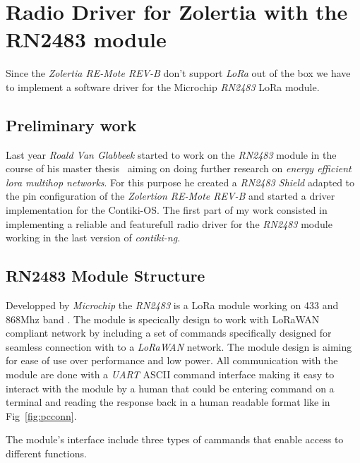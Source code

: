 \chapter{Radio Driver for Zolertia with the RN2483 module}


Since the \emph{Zolertia RE-Mote REV-B} don't support \emph{LoRa} out of the
box we have to implement a software driver for the Microchip \emph{RN2483} LoRa
module.

\section{Preliminary work}

Last year \emph{Roald Van Glabbeek} started to work on the \emph{RN2483} module
in the course of his master thesis~\cite{8847137} aiming on doing further
research on \emph{energy efficient lora multihop networks}. For this purpose he
created a \emph{RN2483 Shield} adapted to the pin configuration of the
\emph{Zolertion RE-Mote REV-B} and started a driver implementation for the
Contiki-OS\@. The first part of my work consisted in implementing a reliable
and featurefull radio driver for the \emph{RN2483} module working in the last
version of \emph{contiki-ng}.

\section{RN2483 Module Structure}

Developped by \emph{Microchip} the \emph{RN2483} is a LoRa module working on
433 and 868Mhz band . The module is specically design to work with LoRaWAN
compliant network by including a set of commands specifically designed for
seamless connection with to a \emph{LoRaWAN} network. The module design is
aiming for ease of use over performance and low power.
All communication with the module are done with a \emph{UART} ASCII command
interface making it easy to interact with the module by a human that could be
entering command on a terminal and reading the response back in a human
readable format like in Fig~\ref{fig:pcconn}.



The module's interface include three types of cammands that enable access to
different functions.

